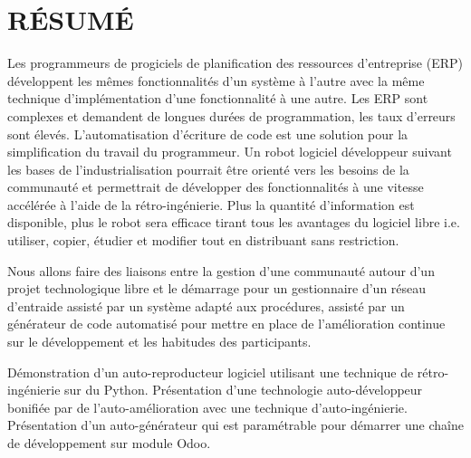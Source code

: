%
\chapter*{RÉSUMÉ}\thispagestyle{headings}

Les programmeurs de progiciels de planification des ressources d’entreprise (ERP) développent les mêmes fonctionnalités d’un système à l’autre avec la même technique d’implémentation d’une fonctionnalité à une autre. Les ERP sont complexes et demandent de longues durées de programmation, les taux d’erreurs sont élevés. L’automatisation d’écriture de code est une solution pour la simplification du travail du programmeur. Un robot logiciel développeur suivant les bases de l’industrialisation pourrait être orienté vers les besoins de la communauté et permettrait de développer des fonctionnalités à une vitesse accélérée à l’aide de la rétro-ingénierie. Plus la quantité d’information est disponible, plus le robot sera efficace tirant tous les avantages du logiciel libre i.e. utiliser, copier, étudier et modifier tout en distribuant sans restriction. 

Nous allons faire des liaisons entre la gestion d'une communauté autour d'un projet technologique libre et le démarrage pour un gestionnaire d'un réseau d'entraide assisté par un système adapté aux procédures, assisté par un générateur de code automatisé pour mettre en place de l'amélioration continue sur le développement et les habitudes des participants.



Démonstration d'un auto-reproducteur logiciel utilisant une technique de rétro-ingénierie sur du Python. Présentation d'une technologie auto-développeur bonifiée par de l'auto-amélioration avec une technique d'auto-ingénierie. Présentation d'un auto-générateur qui est paramétrable pour démarrer une chaîne de développement sur module Odoo.

